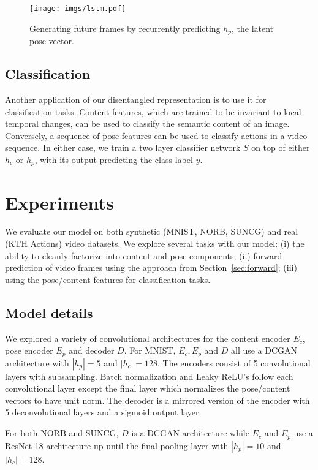 \documentclass{article}
\newcommand{\secc}[1]{Section~\ref{sec:#1}}
\begin{document}
\begin{figure}
    \centering
    \texttt{[image: imgs/lstm.pdf]}
    \caption{Generating future frames by recurrently predicting $h_p$, the latent pose vector. }
    \label{fig:prediction}
\vspace{-3mm}
\end{figure}\subsection{Classification}
Another application of our disentangled representation is to use it for classification tasks. Content features, which are trained to be invariant to local temporal changes, can be used to classify the semantic content of an image. Conversely, a sequence of pose features can be used to classify actions in a video sequence. In either case, we train a two layer classifier network $S$ on top of either $h_c$ or $h_p$, with its output predicting the class label $y$. 

\section{Experiments}
We evaluate our model on both synthetic (MNIST, NORB, SUNCG) and real
(KTH Actions) video datasets. We explore several tasks with our model:
(i) the ability to cleanly factorize into content and pose components;
(ii) forward prediction of video frames using the approach from
\secc{forward}; (iii) using the pose/content features for
classification tasks.

\subsection{Model details}\label{sec:model_details}
We explored a variety of convolutional
architectures for the content encoder $E_c$, pose encoder $E_p$ and
decoder $D$.  For MNIST, $E_c,E_p$ and $D$ all use a DCGAN
 architecture \cite{radford2016} with $\left\vert{h_p}\right\vert = 5$
and $\left\vert{h_c}\right\vert = 128$.  The encoders consist of 5
convolutional layers with subsampling. Batch normalization and Leaky
ReLU's follow each convolutional layer except the final layer which 
normalizes the pose/content vectors to have unit norm.  The decoder is
a mirrored version of the encoder with 5 deconvolutional layers and a sigmoid output layer.

For both NORB and SUNCG, $D$ is a DCGAN architecture while $E_c$ and
$E_p$ use a ResNet-18 architecture \cite{resnet} up until the final pooling layer with  $\left\vert{h_p}\right\vert = 10$ and  $\left\vert{h_c}\right\vert = 128$.
\end{document}
